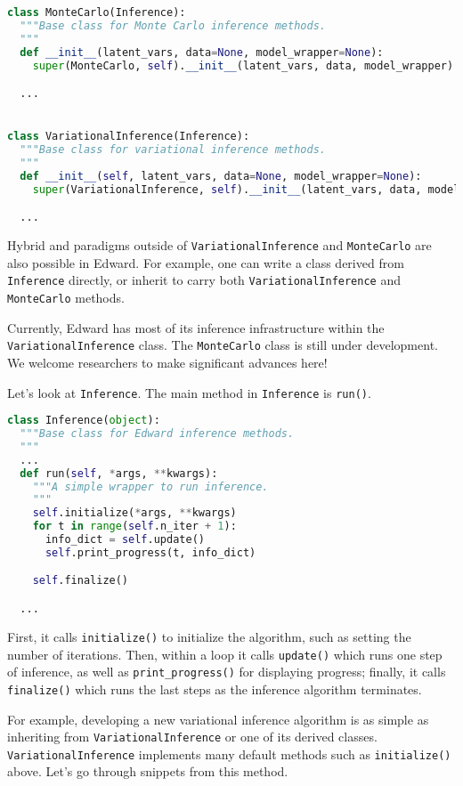 \begin{lstlisting}[language=Python]
class MonteCarlo(Inference):
  """Base class for Monte Carlo inference methods.
  """
  def __init__(latent_vars, data=None, model_wrapper=None):
    super(MonteCarlo, self).__init__(latent_vars, data, model_wrapper)

  ...


class VariationalInference(Inference):
  """Base class for variational inference methods.
  """
  def __init__(self, latent_vars, data=None, model_wrapper=None):
    super(VariationalInference, self).__init__(latent_vars, data, model_wrapper)

  ...
\end{lstlisting}

Hybrid and paradigms outside of \texttt{VariationalInference}
and \texttt{MonteCarlo} are also possible in Edward. For example, one can
write a class derived from \texttt{Inference} directly, or inherit to
carry both \texttt{VariationalInference} and \texttt{MonteCarlo} methods.

Currently, Edward has most of its inference infrastructure within the
\texttt{VariationalInference} class.
The \texttt{MonteCarlo} class is still under development. We welcome
researchers to make significant advances here!

Let's look at \texttt{Inference}. The main method in
\texttt{Inference} is \texttt{run()}.

\begin{lstlisting}[language=Python]
class Inference(object):
  """Base class for Edward inference methods.
  """
  ...
  def run(self, *args, **kwargs):
    """A simple wrapper to run inference.
    """
    self.initialize(*args, **kwargs)
    for t in range(self.n_iter + 1):
      info_dict = self.update()
      self.print_progress(t, info_dict)

    self.finalize()

  ...
\end{lstlisting}

First, it calls \texttt{initialize()} to initialize the algorithm, such as
setting the number of iterations. Then, within a loop it calls
\texttt{update()} which runs one step of inference, as well as
\texttt{print_progress()} for displaying progress; finally, it
calls \texttt{finalize()} which runs the last steps as the inference
algorithm terminates.

For example, developing a new variational inference algorithm is as simple as
inheriting from \texttt{VariationalInference} or one of its derived
classes. \texttt{VariationalInference} implements many default methods such
as \texttt{initialize()} above. Let's go through snippets from this method.

